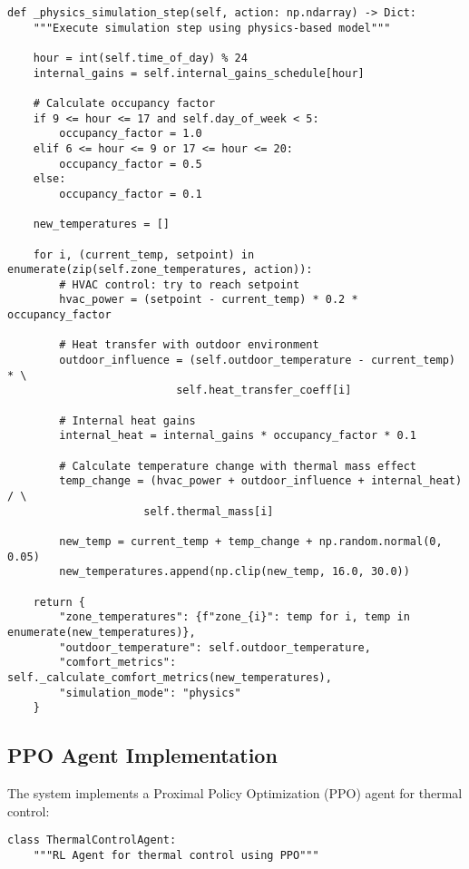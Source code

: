 \documentclass[12pt,a4paper]{article}
\begin{document}
{\begin{lstlisting}[style=python, caption=Physics-Based Simulation]
def _physics_simulation_step(self, action: np.ndarray) -> Dict:
    """Execute simulation step using physics-based model"""
    
    hour = int(self.time_of_day) % 24
    internal_gains = self.internal_gains_schedule[hour]
    
    # Calculate occupancy factor
    if 9 <= hour <= 17 and self.day_of_week < 5:
        occupancy_factor = 1.0
    elif 6 <= hour <= 9 or 17 <= hour <= 20:
        occupancy_factor = 0.5
    else:
        occupancy_factor = 0.1
    
    new_temperatures = []
    
    for i, (current_temp, setpoint) in enumerate(zip(self.zone_temperatures, action)):
        # HVAC control: try to reach setpoint
        hvac_power = (setpoint - current_temp) * 0.2 * occupancy_factor
        
        # Heat transfer with outdoor environment
        outdoor_influence = (self.outdoor_temperature - current_temp) * \
                          self.heat_transfer_coeff[i]
        
        # Internal heat gains
        internal_heat = internal_gains * occupancy_factor * 0.1
        
        # Calculate temperature change with thermal mass effect
        temp_change = (hvac_power + outdoor_influence + internal_heat) / \
                     self.thermal_mass[i]
        
        new_temp = current_temp + temp_change + np.random.normal(0, 0.05)
        new_temperatures.append(np.clip(new_temp, 16.0, 30.0))
    
    return {
        "zone_temperatures": {f"zone_{i}": temp for i, temp in enumerate(new_temperatures)},
        "outdoor_temperature": self.outdoor_temperature,
        "comfort_metrics": self._calculate_comfort_metrics(new_temperatures),
        "simulation_mode": "physics"
    }
\end{lstlisting}

\subsection{PPO Agent Implementation}

The system implements a Proximal Policy Optimization (PPO) agent for thermal control:

\begin{lstlisting}[style=python, caption=PPO Agent Implementation]
class ThermalControlAgent:
    """RL Agent for thermal control using PPO"""
    

\end{lstlisting}}
\end{document}
